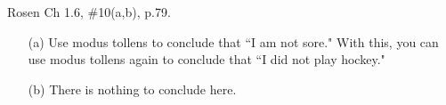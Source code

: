 \documentclass[12pt,addpoints]{exam}
\begin{document}
\begin{questions}
\question[8] Rosen Ch 1.6, \#10(a,b), p.79.
    \begin{solution}
    \begin{itemize}
        \item[(a)] Use modus tollens to conclude that ``I am not sore."  With this, you can use modus tollens again to conclude that ``I did not play hockey."
        \item[(b)] There is nothing to conclude here.
    \end{itemize}
    \end{solution}

\end{questions}
\end{document}
